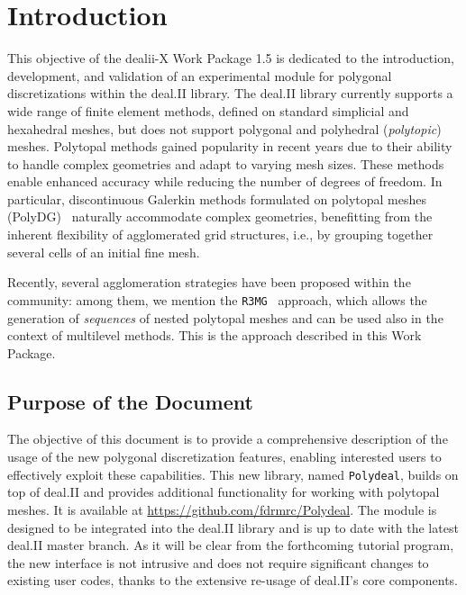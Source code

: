 \documentclass[a4paper,12pt]{article}
\begin{document}
\vspace*{2cm}

\disclaimer

\newpage

\tableofcontents %

\newpage

\section{{Introduction}}
This objective of the dealii-X Work Package 1.5 is dedicated to the introduction, development, and validation
of an experimental module for polygonal discretizations within the deal.II library. The deal.II library
currently supports a wide range of finite element methods, defined on standard simplicial
and hexahedral meshes, but does not support polygonal and polyhedral (\emph{polytopic}) meshes. Polytopal methods
gained popularity in recent years due to their ability to handle complex geometries and adapt to varying mesh
sizes. These methods enable enhanced accuracy while reducing the number of degrees
of freedom. In particular, discontinuous Galerkin methods formulated on polytopal meshes
(PolyDG)~\citep{polyDG,Antoniettihp} naturally accommodate complex geometries, benefitting from the inherent flexibility of
agglomerated grid structures, i.e., by grouping together several cells of an initial fine mesh.

Recently, several agglomeration strategies have been proposed within the community: among them, we mention
the \texttt{R3MG}~\citep{FEDER2025113773} approach, which
allows the generation of \emph{sequences} of nested polytopal meshes and can be used
also in the context of multilevel methods. This is the approach described in this Work Package.

\subsection{{Purpose of the Document}}
The objective of this document is to provide a comprehensive description of
the usage of the new polygonal discretization features, enabling interested users
to effectively exploit these capabilities.  This new library, named \texttt{Polydeal}, builds on top of
deal.II and provides additional functionality for working with polytopal meshes. It is
available at \url{https://github.com/fdrmrc/Polydeal}. The module is designed to be integrated
into the deal.II library and is up to date with the latest deal.II master branch. As it will be clear
from the forthcoming tutorial program, the new interface is not intrusive and does not require significant changes to existing user
codes, thanks to the extensive re-usage of deal.II's core components.
\end{document}
